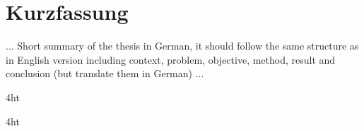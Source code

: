 \documentclass[
  a4paper,  %
  twoside,  %
  bibliography=totoc,
  headsepline,
  cleardoublepage=empty,
  parskip=half,
  draft=false
]{scrbook}
\begin{document}
\section*{Kurzfassung}
... Short summary of the thesis in German, it should follow the same structure as in English version including context, problem, objective, method, result and conclusion (but translate them in German) ...
\cleardoublepage

\iftex4ht
\else
\fi

%
%

%
%
%
\tableofcontents


\listoffigures
\listoftables

\ifdeutsch
\else
\fi

\ifdeutsch
\else
\fi

\printnoidxglossaries

\iftex4ht
\else
\fi


\mainmatter
{}

\renewcommand*{\chapterpagestyle}{scrplain}
\pagestyle{scrheadings}
\pagestyle{scrheadings}
\ihead[]{}
\chead[]{}
\ohead[]{\headmark}
\cfoot[]{}
\ifoot[]{}
\end{document}
